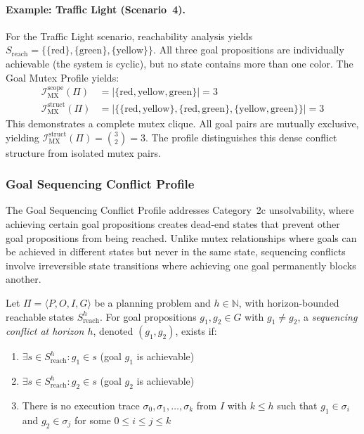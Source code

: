 \paragraph{Example: Traffic Light (Scenario~4).} For the Traffic Light scenario, reachability analysis yields $S_{\text{reach}} = \{\{\text{red}\}, \{\text{green}\}, \{\text{yellow}\}\}$. All three goal propositions are individually achievable (the system is cyclic), but no state contains more than one color. The Goal Mutex Profile yields:
\begin{align*}
    \mathcal{I}^{\text{scope}}_{\text{MX}}(\Pi)  & = |\{\text{red}, \text{yellow}, \text{green}\}| = 3                                                      \\
    \mathcal{I}^{\text{struct}}_{\text{MX}}(\Pi) & = |\{\{\text{red}, \text{yellow}\}, \{\text{red}, \text{green}\}, \{\text{yellow}, \text{green}\}\}| = 3
\end{align*}
This demonstrates a complete mutex clique. All goal pairs are mutually exclusive, yielding $\mathcal{I}^{\text{struct}}_{\text{MX}}(\Pi) = \binom{3}{2} = 3$. The profile distinguishes this dense conflict structure from isolated mutex pairs.

\subsubsection{Goal Sequencing Conflict Profile}
\label{sec:sequencing_conflict_profile}

The Goal Sequencing Conflict Profile addresses Category~2c unsolvability, where achieving certain goal propositions creates dead-end states that prevent other goal propositions from being reached. Unlike mutex relationships where goals can be achieved in different states but never in the same state, sequencing conflicts involve irreversible state transitions where achieving one goal permanently blocks another.

\begin{defn}
    \label{defn:sequencing_conflict}
    Let $\Pi = \langle P, O, I, G \rangle$ be a planning problem and $h \in \mathbb{N}$, with horizon-bounded reachable states $S^h_{\text{reach}}$. For goal propositions $g_1, g_2 \in G$ with $g_1 \neq g_2$, a \emph{sequencing conflict at horizon $h$}, denoted $(g_1, g_2)$, exists if:
    \begin{enumerate}
        \item $\exists s \in S^h_{\text{reach}} : g_1 \in s$ (goal $g_1$ is achievable)
        \item $\exists s \in S^h_{\text{reach}} : g_2 \in s$ (goal $g_2$ is achievable)
        \item There is no execution trace $\sigma_0, \sigma_1, \ldots, \sigma_k$ from $I$ with $k \leq h$ such that $g_1 \in \sigma_i$ and $g_2 \in \sigma_j$ for some $0 \leq i \leq j \leq k$
    \end{enumerate}
\end{defn}

